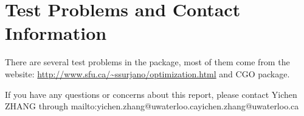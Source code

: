\documentclass[letterpaper,12pt,titlepage,oneside,final]{book}
\newcommand{\href}[1]{#1}
\begin{document}
\section{Test Problems and Contact Information}

There are several test problems in the package, most of them come from the website:
\url{http://www.sfu.ca/~ssurjano/optimization.html} and CGO package.

If you have any questions or concerns about this report, please contact Yichen ZHANG through \href{mailto:yichen.zhang@uwaterloo.ca}{yichen.zhang@uwaterloo.ca}
\end{document}
